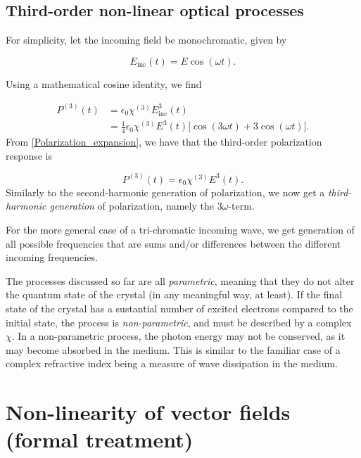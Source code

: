 \documentclass{article}
\begin{document}
\subsection*{Third-order non-linear optical processes}

For simplicity, let the incoming field be monochromatic, given by

\begin{equation}
E_{\text{inc}}(t) = E \cos(\omega t).
\end{equation}

Using a mathematical cosine identity, we find

\begin{equation}
\begin{aligned}
P^{(3)}(t) & = \epsilon_0\chi^{(3)}E_{\text{inc}}^3 (t) \\
& = \frac{1}{4}\epsilon_0\chi^{(3)}E^3 (t) \bigg[ \cos(3\omega t) + 3\cos(\omega t) \bigg].
\end{aligned}
\end{equation}
From \cref{Polarization_expansion}, we have that the third-order polarization response is

\begin{equation}
P^{(3)}(t) = \epsilon_0\chi^{(3)}E^3 (t).
\end{equation}
Similarly to the second-harmonic generation of polarization, we now get a \textit{third-harmonic generation} of polarization, namely the $3\omega$-term.

For the more general case of a tri-chromatic incoming wave, we get generation of all possible frequencies that are sums and/or differences between the different incoming frequencies.

The processes discussed so far are all \textit{parametric}, meaning that they do not alter the quantum state of the crystal (in any meaningful way, at least). If the final state of the crystal has a sustantial number of excited electrons compared to the initial state, the process is \textit{non-parametric}, and must be described by a complex $\chi$. In a non-parametric process, the photon energy may not be conserved, as it may become absorbed in the medium. This is similar to the familiar case of a complex refractive index being a measure of wave dissipation in the medium.


\section*{Non-linearity of vector fields (formal treatment)}
\end{document}
